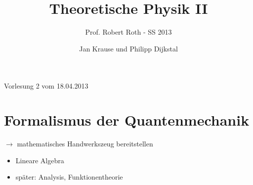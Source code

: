 \documentclass[10pt,article,colorback,accentcolor=tud9d]{scrartcl}
\title{Theoretische Physik II}
\subtitle{Prof. Robert Roth - SS 2013}
\author{Jan Krause und Philipp Dijkstal}
\begin{document}
\maketitle
\tableofcontents
\newpage
\begin{flushright}Vorlesung 2 vom 18.04.2013\end{flushright}
\section{Formalismus der Quantenmechanik}
$\rightarrow$ mathematisches Handwerkszeug bereitstellen\\
\begin{itemize}
\item Lineare Algebra
\item später: Analysis, Funktionentheorie
\end{itemize}
\end{document}
